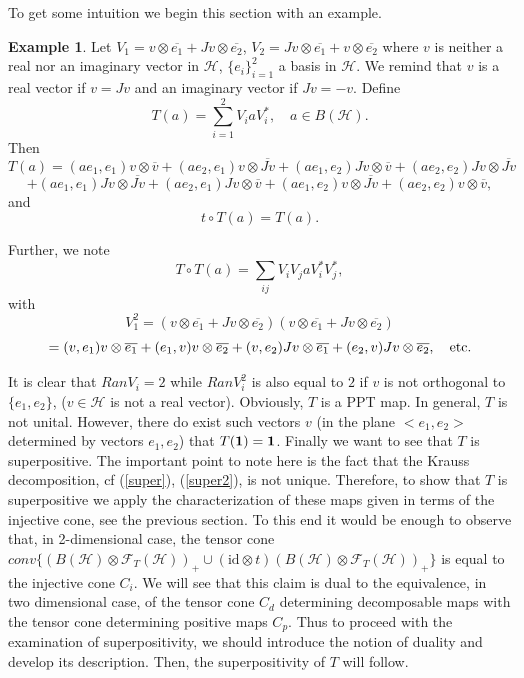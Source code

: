 \documentclass{amsart}
\theoremstyle{plain}
\theoremstyle{definition}
\newtheorem{exmp}[thm]{Example}
\newcommand{\id}{\mathrm{id}}
\newcommand{\cH}{\mathcal{H}}
\begin{document}
To get some intuition we begin this section with an example.
\begin{exmp}
\label{3.1}
Let $V_1= v \otimes \overline{e_1} + Jv \otimes \overline{e_2}$,  $V_2= Jv \otimes \overline{e_1} + v \otimes \overline{e_2}$ where $v$ is neither a real  nor an imaginary vector in $\cH$, $\{e_i\}_{i=1}^2$ a basis in $\cH$. We remind that $v$ is a real vector if $v = Jv$ and an imaginary vector if $Jv = - v$.
Define
\begin{equation}
T(a) = \sum_{i=1}^2 V_i a V^*_i, \quad a \in B(\cH).
\end{equation}
Then
\begin{equation}
T(a) = (ae_1,e_1) v \otimes \overline{v} + (ae_2,e_1) v \otimes \overline{Jv} + (ae_1,e_2) Jv \otimes \overline{v}
+ (ae_2,e_2)Jv \otimes \overline{Jv}
\end{equation}
$$+ (ae_1,e_1) Jv \otimes \overline{Jv} + (ae_2,e_1) Jv \otimes \overline{v} + (ae_1,e_2) v \otimes \overline{Jv}
+ (ae_2,e_2)v \otimes \overline{v}, $$
and 
\begin{equation}
t \circ T(a) = T(a).
\end{equation}

Further, we note
\begin{equation}
T\circ T (a) = \sum_{ij} V_iV_j a V_i^* V_j^*,
\end{equation}
with
\begin{equation}
V_1^2 = \left(v\otimes \overline{e_1} + Jv \otimes \overline{e_2}\right)\left(v \otimes \overline{e_1} + Jv \otimes \overline{e_2}\right)
\end{equation} 
$$= (v,e_1) v\otimes \overline{e_1} + (e_1,v) v \otimes \overline{e_2} + (v,e_2) Jv \otimes \overline{e_1} + (e_2,v) Jv \otimes \overline{e_2} , \quad \rm{etc.}$$

It is clear that $Ran V_i = 2$ while $Ran V_i^2$ is also equal to $2$ if $v$ is not orthogonal to $\{e_1, e_2 \}$,  ($v \in \cH$ is not a real vector). Obviously, $T$ is a PPT map. In general, $T$ is not unital. However, there do exist such vectors $v$ (in the plane $<e_1,e_2>$ determined by vectors $e_1,e_2$) that $T(\bf{1}) = \bf{1}$.
Finally we want to see that $T$ is superpositive. 
The important point to note here is the fact that the Krauss decomposition, cf (\ref{super}), (\ref{super2}), is not unique. Therefore, to show that $T$ is superpositive we apply the characterization of these maps given in terms of the injective cone, see the previous section. To this end 
it would be enough to observe that, in 2-dimensional case, the tensor cone $conv\{\left(B(\cH) \otimes \mathcal{F}_T(\cH) \right)_+ \cup \left(\id\otimes t\right) \left(B(\cH) \otimes \mathcal{F}_T(\cH) \right)_+\}$
is equal to the injective cone $C_i$.  We will see that
 this claim  is dual to the equivalence, in two dimensional case, of the tensor cone $C_d$ determining decomposable maps with the tensor cone determining positive maps $C_p$.
Thus to proceed with the examination of superpositivity,  we should introduce the notion of duality and develop its description. Then, the superpositivity of $T$ will follow.
\end{exmp}
\end{document}

